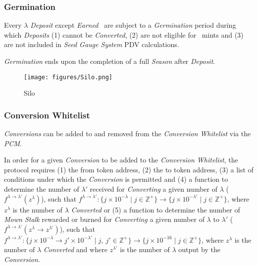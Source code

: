 \documentclass[tikz]{article}
\newcommand{\term}[1]{\textsl{#1}}
\newcommand{\Pinto}{} %
\begin{document}

\subsubsection{Germination}

Every $\lambda$ \term{Deposit} except \term{Earned} \Pinto\ are subject to a \term{Germination} period during which \term{Deposits} (1) cannot be \term{Converted}, (2) are not eligible for \Pinto\ mints and (3) are not included in \term{Seed Gauge System} PDV calculations. 

\term{Germination} ends upon the completion of a full \term{Season} after \term{Deposit}.

\newpage


\begin{figure}[h!]
    \centering
    \texttt{[image: figures/Silo.png]}
    \vspace*{-5mm}
    \caption{Silo}
    \label{Silo}
\end{figure}


\subsubsection{Conversion Whitelist}

\term{Conversions} can be added to and removed from the \term{Conversion Whitelist} via the \term{PCM}.

In order for a given \term{Conversion} to be added to the \term{Conversion Whitelist}, the protocol requires 
(1) the from token address, 
(2) the to token address, 
(3) a list of conditions under which the \term{Conversion} is permitted and 
(4) a function to determine the number of $\lambda'$ received for \term{Converting} a given number of $\lambda$ ($f^{\lambda \rightarrow \lambda'}(z^{\lambda})$), such that $f^{\lambda \rightarrow \lambda'}\colon \{j \times 10^{-\lambda} \mid j \in \mathbb{Z}^{+} \} \rightarrow \{j \times 10^{-\lambda'} \mid j \in \mathbb{Z}^{+} \}$, where $z^{\lambda}$ is the number of $\lambda$ \term{Converted} or 
(5) a function to determine the number of \term{Mown Stalk} rewarded or burned for \term{Converting} a given number of $\lambda$ to $\lambda'$ ($f^{\lambda \rightarrow \lambda'}(z^{\lambda} \rightarrow z^{\lambda'})$), such that $f^{\lambda \rightarrow \lambda'}\colon \{j \times 10^{-\lambda} \rightarrow j' \times 10^{-\lambda'} \mid j,\ j' \in \mathbb{Z}^{+} \} \rightarrow \{j \times 10^{-16} \mid j \in \mathbb{Z}^{+} \}$, where $z^{\lambda}$ is the number of $\lambda$ \term{Converted} and where $z^{\lambda'}$ is the number of $\lambda$ output by the \term{Conversion}. 
\end{document}
